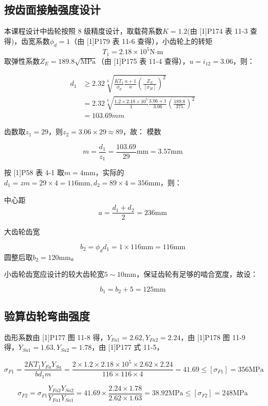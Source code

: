 \documentclass[12pt]{ctexart}
\begin{document}
\subsection{按齿面接触强度设计}

本课程设计中齿轮按照 8 级精度设计，取载荷系数$K=1.2$(由 [1]P174 表 11-3 查得)，齿宽系数$\phi_d=1$（由 [1]P179 表 11-6 查得），小齿轮上的转矩
$$T_1 = 2.18 \times 10^5 \text{N·m}$$
取弹性系数$Z_E = 189.8 \sqrt{\text{MPa}}$（由 [1]P175 表 11-4 查得），$u=i_{12}=3.06$，则：

\begin{align*}
    d_1 & \ge 2.32\sqrt[3]{\frac{KT_1}{\phi_d}\frac{u+1}{u}\left(\frac{Z_E}{[\sigma_{H}]}\right)^2}\\
    & = 2.32\sqrt[3]{\frac{1.2\times 2.18 \times 10^5}{1}\frac{3.06+1}{3.06}\left(\frac{189.8}{375}\right)^2} \\
    & =103.69 mm 
\end{align*}

齿数取$z_1=29$，则$z_2=3.06\times 29\approx 89$，故：
模数

$$m=\frac{d_1}{z_1}=\frac{103.69}{29}\text{mm}=3.57\text{mm}$$

按 [1]P58 表 4-1 取$m=4\text{mm}$，实际的$d_1 = zm=29\times 4=116\text{mm}, d_2=89\times 4=356\text{mm}$，则：

中心距$$a = \frac{d_1+d_2}{2} = 236\text{mm}$$


大齿轮齿宽

$$b_2=\phi_dd_1=1\times 116\text{mm}=116\text{mm}$$
圆整后取$b_2=120\text{mm}$。

小齿轮齿宽应设计的较大齿轮宽$5\sim 10 \text{mm}$，保证齿轮有足够的啮合宽度，故设：

$$b_1 = b_2 + 5 = 125 \text{mm}$$


\subsection{验算齿轮弯曲强度}

齿形系数由 [1]P177 图 11-8 得，$Y_{Fa1}=2.62,Y_{Fa2}=2.24$，由 [1]P178 图 11-9 得，$Y_{Sa1}=1.63,Y_{Sa2}=1.78$，由 [1]P177 式 11-5，

$$\sigma_{F1}=\frac{2KT_1Y_{Fa}Y_{Sa}}{bd_1m}=\frac{2\times 1.2 \times 2.18\times 10^5\times 2.62\times 2.24}{116\times 116\times 4} = 41.69 \le [\sigma_{F1}]=356\text{MPa}$$

$$\sigma_{F2}=\sigma_{F1}\frac{Y_{Fa2}Y_{Sa2}}{Y_{Fa1}Y_{Sa1}}=41.69\times \frac{2.24\times 1.78}{2.62\times 1.63}=38.92\text{MPa}\le [\sigma_{F2}]=248\text{MPa}$$
\end{document}
